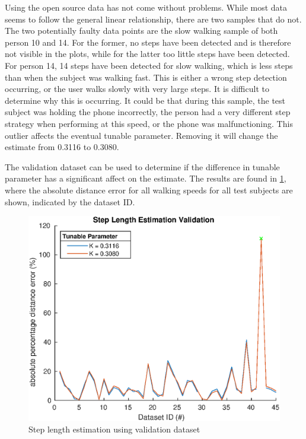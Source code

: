 Using the open source data has not come without problems. While most data seems to follow the general linear relationship, there are two samples that do not. The two potentially faulty data points are the slow walking sample of both person 10 and 14. For the former, no steps have been detected and is therefore not visible in the plots, while for the latter too little steps have been detected. For person 14, 14 steps have been detected for slow walking, which is less steps than when the subject was walking fast. This is either a wrong step detection occurring, or the user walks slowly with very large steps. It is difficult to determine why this is occurring. It could be that during this sample, the test subject was holding the phone incorrectly, the person had a very different step strategy when performing at this speed, or the phone was malfunctioning. This outlier affects the eventual tunable parameter. Removing it will change the estimate from 0.3116 to 0.3080. \par 

The validation dataset can be used to determine if the difference in tunable parameter has a significant affect on the estimate. The results are found in  \cref{fig:step_length_estimation_validation}, where the absolute distance error for all walking speeds for all test subjects are shown, indicated by the dataset ID.
\begin{figure}[H]
	\centering
	\includegraphics[width=0.6\linewidth]{images/20201028_1344_Step_Length_Estimation_Validation}
	\caption{Step length estimation using validation dataset}
	\label{fig:step_length_estimation_validation}
\end{figure}

